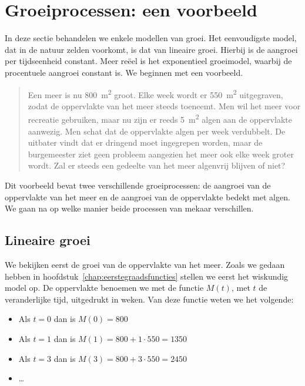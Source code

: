 \newpage
\section{Groeiprocessen: een voorbeeld}
In deze sectie behandelen we enkele modellen van groei. Het eenvoudigste model, dat in de natuur zelden voorkomt, is dat van lineaire groei. Hierbij is de aangroei per tijdseenheid constant. Meer re\"eel is het exponentieel groeimodel, waarbij de procentuele aangroei constant is. We beginnen met een voorbeeld.

\label{page:meeralgen}
\begin{quote}
    Een meer is nu \SI{800}{\square\meter} groot. Elke week wordt er \SI{550}{\square\meter} uitgegraven, zodat de oppervlakte van het meer steeds
toeneemt. Men wil het meer voor recreatie gebruiken, maar nu zijn
er reeds \SI{5}{\square\meter} algen aan de oppervlakte aanwezig. Men schat
dat de oppervlakte algen per week verdubbelt. De uitbater vindt
dat er dringend moet ingegrepen worden, maar de burgemeester ziet
geen probleem aangezien het meer ook elke week groter wordt.
Zal er steeds een gedeelte van het meer algenvrij blijven of niet?
\end{quote}
Dit voorbeeld bevat twee verschillende groeiprocessen: de aangroei van de
oppervlakte van het meer en de aangroei van de oppervlakte bedekt met algen.
We gaan na op welke manier beide processen van mekaar verschillen.

\subsection{Lineaire groei}
We bekijken eerst de groei van de oppervlakte van het meer. Zoals we gedaan hebben in hoofdstuk~\ref{chap:eerstegraadsfuncties} stellen we eerst het wiskundig model op. 
De oppervlakte benoemen we met de functie $M(t)$, met $t$ de veranderlijke tijd, uitgedrukt in weken.
Van deze functie weten we het volgende:

\begin{itemize}
  \item  Als $t=0$ dan is $M(0)=800$
  \item  Als $t=1$ dan is $M(1)=800+1\cdot 550=1350$
  \item  Als $t=3$ dan is $M(3)=800+3\cdot 550=2450$
  \item  \ldots
\end{itemize}

